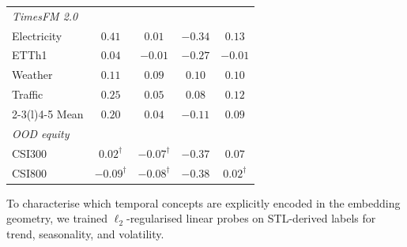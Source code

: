 \documentclass[10pt]{article}
\theoremstyle{definition}
\theoremstyle{remark}
\begin{document}
\begin{table}[t]
\begin{minipage}[t]{0.44\linewidth}
\begin{tabular}{lcccc}
\midrule
\multicolumn{5}{l}{\textit{TimesFM 2.0}}\\
Electricity & $\mathbf{0.41}$ & $0.01$  & $-0.34$ & $0.13$\\
ETTh1       & $0.04$          & $-0.01$ & $-0.27$ & $-0.01$\\
Weather     & $0.11$          & $0.09$  & $0.10$  & $0.10$\\
Traffic     & $\mathbf{0.25}$ & $0.05$  & $0.08$  & $0.12$\\
\cmidrule(r){2-3}\cmidrule(l){4-5}
Mean        & $\mathbf{0.20}$ & $0.04$  & $-0.11$ & $0.09$\\
\midrule
\multicolumn{5}{l}{\textit{OOD equity}}\\
CSI300 & $0.02^\dagger$ & $-0.07^\dagger$ & $-0.37$ & $0.07$\\
CSI800 & $-0.09^\dagger$& $-0.08^\dagger$ & $-0.38$ & $0.02^\dagger$\\
\bottomrule
\end{tabular}
\end{minipage}
\end{table}

To characterise which temporal concepts are explicitly encoded in the embedding
geometry, we trained $\ell_2$-regularised linear probes on STL-derived labels
for trend, seasonality, and volatility.
\end{document}

